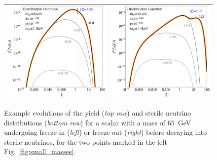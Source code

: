 \begin{figure}[t!]
\begin{tabular}{cc}
 \hspace{-1cm}\includegraphics[width=8.3cm]{figures/snapshots65FIMP.pdf} & \includegraphics[width=8.3cm]{figures/snapshots65WIMP.pdf}
\end{tabular}
\caption{\label{fig:FIMP_WIMP_65}Example evolutions of the yield (\emph{top row}) and sterile neutrino distributions (\emph{bottom row}) for a scalar with a mass of $65$~GeV undergoing freeze-in (\emph{left}) or freeze-out (\emph{right}) before decaying into sterile neutrinos, for the two points marked in the left Fig.~\ref{fig:small_masses}.}
\end{figure}

